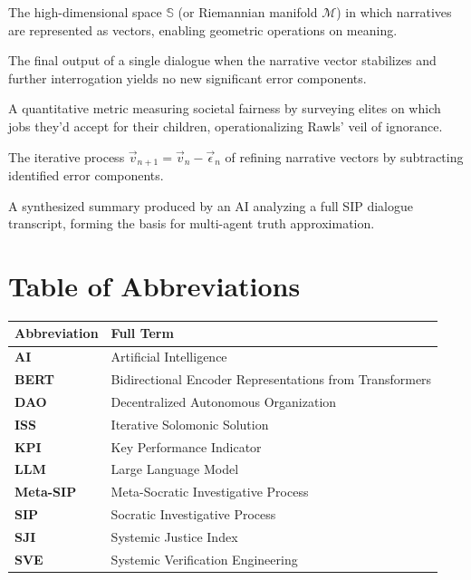 \documentclass[11pt,a4paper]{article}
\begin{document}
\begin{small}
\begin{description}[style=nextline, leftmargin=0pt, labelindent=0pt, font=\normalfont\bfseries]
    \item[Semantic Manifold] The high-dimensional space $\mathbb{S}$ (or Riemannian manifold $\mathcal{M}$) in which narratives are represented as vectors, enabling geometric operations on meaning.
    
    \item[Stabilized Fact ($F_h^*$)] The final output of a single dialogue when the narrative vector stabilizes and further interrogation yields no new significant error components.
    
    \item[Systemic Justice Index (SJI)] A quantitative metric measuring societal fairness by surveying elites on which jobs they'd accept for their children, operationalizing Rawls' veil of ignorance.
    
    \item[Vectorial Purification] The iterative process $\vec{v}_{n+1} = \vec{v}_n - \vec{\epsilon}_n$ of refining narrative vectors by subtracting identified error components.
    
    \item[Verdict] A synthesized summary produced by an AI analyzing a full SIP dialogue transcript, forming the basis for multi-agent truth approximation.
\end{description}

\section*{Table of Abbreviations}

\begin{tabular}{@{}>{\bfseries}ll@{}}
\toprule
\normalfont\textbf{Abbreviation} & \textbf{Full Term} \\
\midrule
AI & Artificial Intelligence \\
BERT & Bidirectional Encoder Representations from Transformers \\
DAO & Decentralized Autonomous Organization \\
ISS & Iterative Solomonic Solution \\
KPI & Key Performance Indicator \\
LLM & Large Language Model \\
Meta-SIP & Meta-Socratic Investigative Process \\
SIP & Socratic Investigative Process \\
SJI & Systemic Justice Index \\
SVE & Systemic Verification Engineering \\
\bottomrule
\end{tabular}


\end{small}
\end{document}
